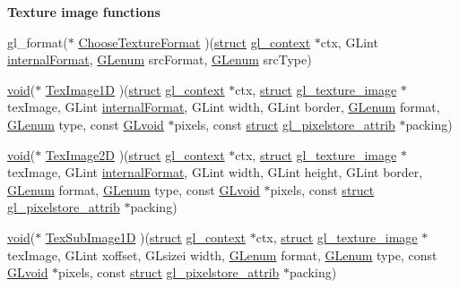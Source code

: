 \begin{Indent}\textbf{ Texture image functions}\par
\begin{DoxyCompactItemize}
\item 
gl\+\_\+format($\ast$ \hyperlink{structdd__function__table_ab3029e9747f5413c4e33efb89c245462}{Choose\+Texture\+Format} )(\hyperlink{interfacestruct}{struct} \hyperlink{structgl__context}{gl\+\_\+context} $\ast$ctx, G\+Lint \hyperlink{interfacevoid}{internal\+Format}, \hyperlink{interfacevoid}{G\+Lenum} src\+Format, \hyperlink{interfacevoid}{G\+Lenum} src\+Type)
\item 
\hyperlink{interfacevoid}{void}($\ast$ \hyperlink{structdd__function__table_a0907a18e4f97b0e8f36e50d8f5e7e369}{Tex\+Image1D} )(\hyperlink{interfacestruct}{struct} \hyperlink{structgl__context}{gl\+\_\+context} $\ast$ctx, \hyperlink{interfacestruct}{struct} \hyperlink{structgl__texture__image}{gl\+\_\+texture\+\_\+image} $\ast$tex\+Image, G\+Lint \hyperlink{interfacevoid}{internal\+Format}, G\+Lint width, G\+Lint border, \hyperlink{interfacevoid}{G\+Lenum} format, \hyperlink{interfacevoid}{G\+Lenum} type, const \hyperlink{interfacevoid}{G\+Lvoid} $\ast$pixels, const \hyperlink{interfacestruct}{struct} \hyperlink{structgl__pixelstore__attrib}{gl\+\_\+pixelstore\+\_\+attrib} $\ast$packing)
\item 
\hyperlink{interfacevoid}{void}($\ast$ \hyperlink{structdd__function__table_a2640ee0c4221b29d2f01603424cd3b3a}{Tex\+Image2D} )(\hyperlink{interfacestruct}{struct} \hyperlink{structgl__context}{gl\+\_\+context} $\ast$ctx, \hyperlink{interfacestruct}{struct} \hyperlink{structgl__texture__image}{gl\+\_\+texture\+\_\+image} $\ast$tex\+Image, G\+Lint \hyperlink{interfacevoid}{internal\+Format}, G\+Lint width, G\+Lint height, G\+Lint border, \hyperlink{interfacevoid}{G\+Lenum} format, \hyperlink{interfacevoid}{G\+Lenum} type, const \hyperlink{interfacevoid}{G\+Lvoid} $\ast$pixels, const \hyperlink{interfacestruct}{struct} \hyperlink{structgl__pixelstore__attrib}{gl\+\_\+pixelstore\+\_\+attrib} $\ast$packing)
\item 
\hyperlink{interfacevoid}{void}($\ast$ \hyperlink{structdd__function__table_aa633b8ffb5cbcacb00177fe255481faa}{Tex\+Sub\+Image1D} )(\hyperlink{interfacestruct}{struct} \hyperlink{structgl__context}{gl\+\_\+context} $\ast$ctx, \hyperlink{interfacestruct}{struct} \hyperlink{structgl__texture__image}{gl\+\_\+texture\+\_\+image} $\ast$tex\+Image, G\+Lint xoffset, G\+Lsizei width, \hyperlink{interfacevoid}{G\+Lenum} format, \hyperlink{interfacevoid}{G\+Lenum} type, const \hyperlink{interfacevoid}{G\+Lvoid} $\ast$pixels, const \hyperlink{interfacestruct}{struct} \hyperlink{structgl__pixelstore__attrib}{gl\+\_\+pixelstore\+\_\+attrib} $\ast$packing)

\end{DoxyCompactItemize}
\end{Indent}
